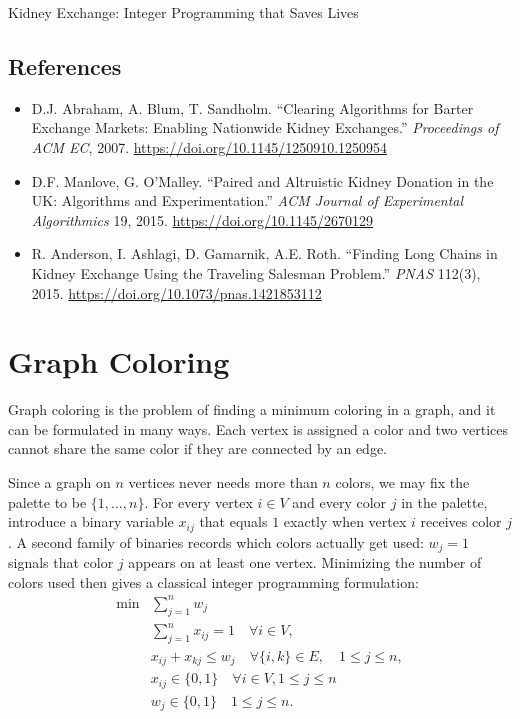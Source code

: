 \begin{casestudybox}{Kidney Exchange: Integer Programming that Saves Lives}
\subsection*{References}
\begin{itemize}
\item D.J. Abraham, A. Blum, T. Sandholm. ``Clearing Algorithms for Barter Exchange Markets: Enabling Nationwide Kidney Exchanges.'' \emph{Proceedings of ACM EC}, 2007. \url{https://doi.org/10.1145/1250910.1250954}
\item D.F. Manlove, G. O'Malley. ``Paired and Altruistic Kidney Donation in the UK: Algorithms and Experimentation.'' \emph{ACM Journal of Experimental Algorithmics} 19, 2015. \url{https://doi.org/10.1145/2670129}
\item R. Anderson, I. Ashlagi, D. Gamarnik, A.E. Roth. ``Finding Long Chains in Kidney Exchange Using the Traveling Salesman Problem.'' \emph{PNAS} 112(3), 2015. \url{https://doi.org/10.1073/pnas.1421853112}
\end{itemize}
\end{casestudybox}

\section{Graph Coloring}
\label{sec:graph-coloring}

Graph coloring %
 is
the problem of finding a minimum coloring in a graph, and it can be formulated in many ways. Each vertex is assigned a color and two vertices cannot share the same color if they are connected by an edge.

Since a graph on $n$ vertices never needs more than $n$ colors, we may fix the palette to be $\{1, \ldots, n\}$.
For every vertex $i \in V$ and every color $j$ in the palette, introduce a binary variable $x_{ij}$ that equals $1$ exactly when vertex $i$ receives color $j$.
A second family of binaries records which colors actually get used: $w_j = 1$ signals that color $j$ appears on at least one vertex.
Minimizing the number of colors used then gives a classical integer programming formulation:
$$
\begin{aligned}
\min & \sum_{j=1}^n w_j \\
& \sum_{j=1}^n x_{i j}=1 \quad \forall i \in V, \\
& x_{i j}+x_{k j} \leq w_j \quad \forall\{i, k\} \in E, \quad 1 \leq j \leq n, \\
& x_{i j} \in\{0,1\} \quad \forall i \in V, 1 \leq j \leq n\\
& w_j \in\{0,1\} \quad 1 \leq j \leq n .
\end{aligned}
$$


